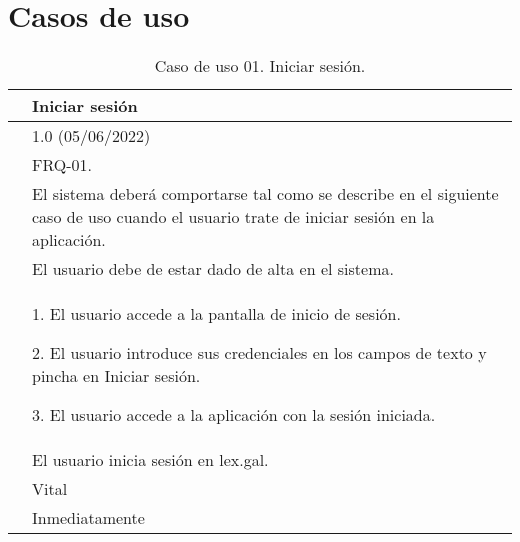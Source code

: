 \section{Casos de uso}
\label{APCasosUso}

\begin{table}[H]
\begin{center}
\begin{tabular}{|p{3cm}|p{10cm}|} \hline
\centering {\bf UC-01} & Iniciar sesión  \\ \hline\hline
\centering {\bf Versión} & 1.0 (05/06/2022) \\ \hline
\centering {\bf Dependencias} &  FRQ-01. \\ \hline
\centering {\bf Descripción} &  El sistema deberá comportarse tal como se describe en el siguiente caso de uso cuando el usuario trate de iniciar sesión en la aplicación. \\ \hline
\centering {\bf Precondición} &  El usuario debe de estar dado de alta en el sistema. \\ \hline
\centering {\bf Secuencia normal} &  
1. El usuario accede a la pantalla de inicio de sesión.

2. El usuario introduce sus credenciales en los campos de texto y pincha en Iniciar sesión.

3. El usuario accede a la aplicación con la sesión iniciada.
\\ \hline
\centering {\bf Postcondición} &  El usuario inicia sesión en lex.gal. \\ \hline
\centering {\bf Importancia} & Vital \\ \hline
\centering {\bf Urgencia} & Inmediatamente \\ \hline
\end{tabular}
\caption{Caso de uso 01. Iniciar sesión.}
\label{enlaceUC1}
\end{center}
\end{table}

